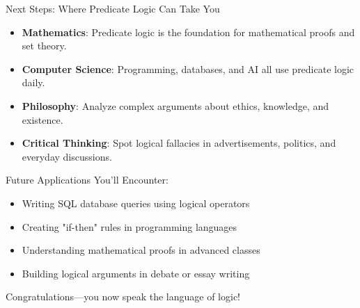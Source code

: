 \documentclass{beamer}
\begin{document}
	\begin{frame}{Next Steps: Where Predicate Logic Can Take You}
		\begin{itemize}
			\item \textbf{Mathematics}: Predicate logic is the foundation for mathematical proofs and set theory.
			\item \textbf{Computer Science}: Programming, databases, and AI all use predicate logic daily.
			\item \textbf{Philosophy}: Analyze complex arguments about ethics, knowledge, and existence.
			\item \textbf{Critical Thinking}: Spot logical fallacies in advertisements, politics, and everyday discussions.
		\end{itemize}
		
		\begin{example}
			Future Applications You'll Encounter:
			\begin{itemize}
				\item Writing SQL database queries using logical operators
				\item Creating "if-then" rules in programming languages
				\item Understanding mathematical proofs in advanced classes
				\item Building logical arguments in debate or essay writing
			\end{itemize}
		\end{example}
		
		\begin{center}
			\Large{Congratulations—you now speak the language of logic!}
		\end{center}
	\end{frame}
	
\end{document}
